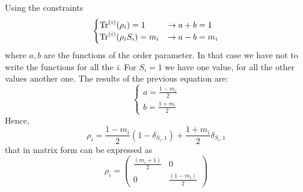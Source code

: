 \documentclass[../main/main.tex]{subfiles}
\begin{document}
Using the constraints
\begin{equation*}
  \begin{cases}
    \Tr^{(i)}(\rho _i) = 1  &\rightarrow  a+b=1\\
    \Tr^{(i)}(\rho _i S_i) = m_i  & \rightarrow a-b = m_i
  \end{cases}
\end{equation*}
where \( a,b \) are the functions of the order parameter.
In that case we have not to write the functions for all the \emph{i}. For \( S_i = 1 \) we have one value, for all the other values another one.
The results of the previous equation are:
\begin{equation*}
  \begin{cases}
   a = \frac{1-m_i}{2} \\
   b = \frac{1+m_i}{2}
  \end{cases}
\end{equation*}
Hence,
\begin{equation}
  \rho _i =   \frac{1-m_i}{2}  (1- \delta _{S_i,1}) + \frac{1+m_i}{2} \delta _{S_i,1}
\end{equation}
that in matrix form can be expressed as
\begin{equation}
\rho_i = 
\begin{pmatrix}
\frac{(m_i+1)}{2}   & 0 \\
  0 &    \frac{(1-m_i)}{2}
\end{pmatrix}
\end{equation}
\end{document}
